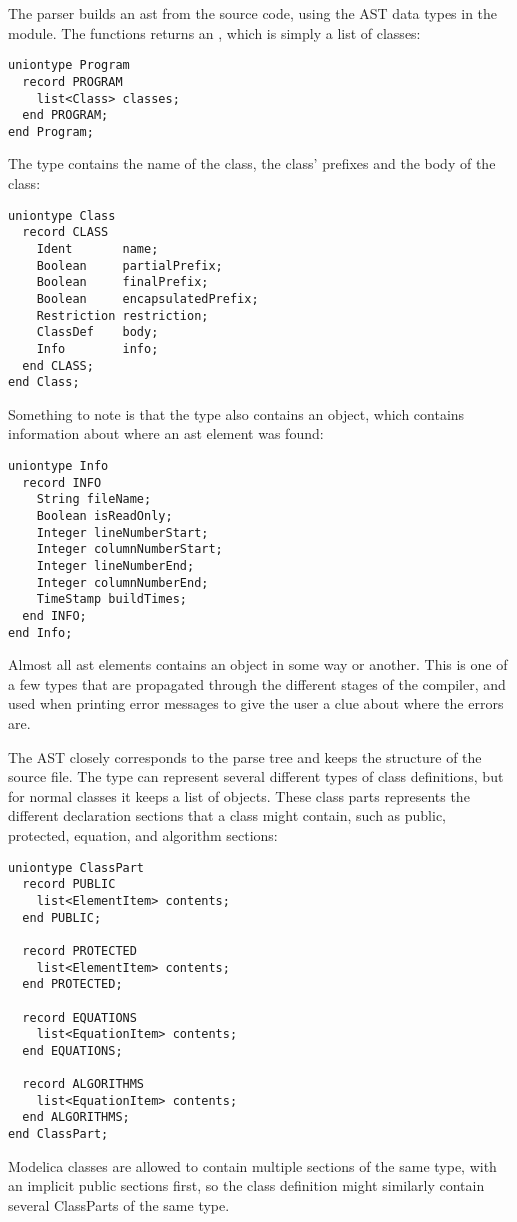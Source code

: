 The parser builds an \gls{ast} from the source code, using the AST data types in
the  module. The  functions returns an
, which is simply a list of classes:
\begin{lstlisting}[language=modelica]
uniontype Program
  record PROGRAM
    list<Class> classes;
  end PROGRAM;
end Program;
\end{lstlisting}
The  type contains the name of the class, the class' prefixes
and the body of the class:
\begin{lstlisting}[language=modelica]
uniontype Class
  record CLASS
    Ident       name;
    Boolean     partialPrefix;
    Boolean     finalPrefix;
    Boolean     encapsulatedPrefix;
    Restriction restriction;
    ClassDef    body;
    Info        info;
  end CLASS;
end Class;
\end{lstlisting}
Something to note is that the type also contains an  object,
which contains information about where an \gls{ast} element was found: 
\begin{lstlisting}[language=modelica]
uniontype Info
  record INFO
    String fileName;
    Boolean isReadOnly;
    Integer lineNumberStart;
    Integer columnNumberStart;
    Integer lineNumberEnd;
    Integer columnNumberEnd;
    TimeStamp buildTimes;
  end INFO;
end Info;
\end{lstlisting}
Almost all \gls{ast} elements contains an  object in some way
or another.  This is one of a few types that are propagated through the
different stages of the compiler, and used when printing error messages to give
the user a clue about where the errors are.

The AST closely corresponds to the parse tree and keeps the structure of the
source file. The  type can represent several different
types of class definitions, but for normal classes it keeps a list of
 objects. These class parts represents the different
declaration sections that a class might contain, such as public, protected,
equation, and algorithm sections:
\begin{lstlisting}[language=modelica]
uniontype ClassPart
  record PUBLIC
    list<ElementItem> contents;
  end PUBLIC;

  record PROTECTED
    list<ElementItem> contents;
  end PROTECTED;

  record EQUATIONS
    list<EquationItem> contents;
  end EQUATIONS;

  record ALGORITHMS
    list<EquationItem> contents;
  end ALGORITHMS;
end ClassPart;
\end{lstlisting}
Modelica classes are allowed to contain multiple sections of the same type, with
an implicit public sections first, so the class definition might similarly
contain several ClassParts of the same type.

